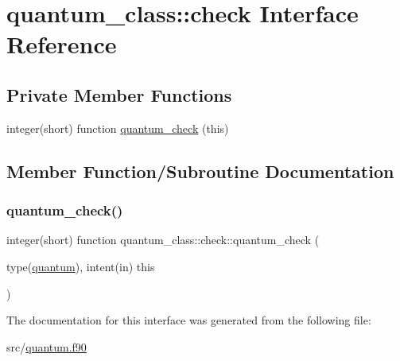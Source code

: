 \hypertarget{interfacequantum__class_1_1check}{}\section{quantum\+\_\+class\+:\+:check Interface Reference}
\label{interfacequantum__class_1_1check}
\subsection*{Private Member Functions}
\begin{DoxyCompactItemize}
\item 
integer(short) function \hyperlink{interfacequantum__class_1_1check_a05d5b06760f2f7349f19267467e6da00}{quantum\+\_\+check} (this)
\end{DoxyCompactItemize}


\subsection{Member Function/\+Subroutine Documentation}
\mbox{\label{interfacequantum__class_1_1check_a05d5b06760f2f7349f19267467e6da00}} 
\subsubsection{\texorpdfstring{quantum\+\_\+check()}{quantum\_check()}}
{\footnotesize\ttfamily integer(short) function quantum\+\_\+class\+::check\+::quantum\+\_\+check (\begin{DoxyParamCaption}\item[{type(\hyperlink{structquantum__class_1_1quantum}{quantum}), intent(in)}]{this }\end{DoxyParamCaption})\hspace{0.3cm}{\ttfamily [private]}}



The documentation for this interface was generated from the following file\+:\begin{DoxyCompactItemize}
\item 
src/\hyperlink{quantum_8f90}{quantum.\+f90}\end{DoxyCompactItemize}
